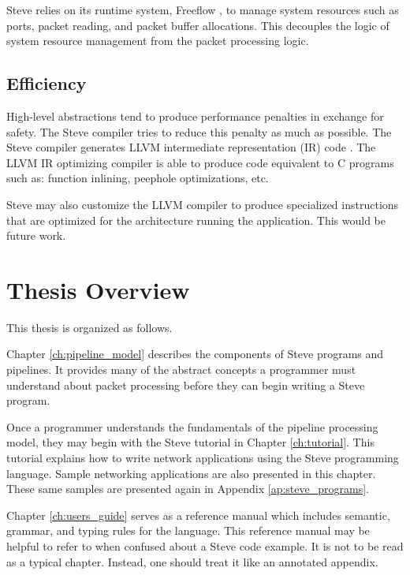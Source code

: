 Steve relies on its runtime system, Freeflow \cite{freeflow_software}, 
to manage system resources such as
ports, packet reading, and packet buffer allocations.
This decouples the logic of system resource management from the packet
processing logic.

\subsection{Efficiency}


High-level abstractions tend to produce performance penalties in exchange
for safety. The Steve compiler tries to reduce this penalty as much as possible.
The Steve compiler generates LLVM intermediate representation (IR) code
\cite{llvm_webpage}. The LLVM IR optimizing compiler is able to produce 
code equivalent to C programs such as:
function inlining, peephole optimizations, etc.

Steve may also customize the LLVM compiler to produce
specialized instructions that are optimized for the architecture running
the application. This would be future work.

\section{Thesis Overview}

This thesis is organized as follows.

Chapter \ref{ch:pipeline_model} describes the components of Steve programs
and pipelines. It provides many of the abstract concepts a programmer must
understand about packet processing before they can begin writing a Steve
program.

Once a programmer understands the fundamentals of the pipeline processing model,
they may begin with the Steve tutorial in Chapter \ref{ch:tutorial}.
This tutorial explains how to write network applications using the
Steve programming language. Sample networking applications are also presented in
this chapter. These same samples are presented again in Appendix
\ref{ap:steve_programs}. 

Chapter \ref{ch:users_guide} serves as a reference
manual which includes semantic, grammar, and typing rules for the language.
This reference manual may be helpful to refer to when confused about a
Steve code example.
It is not to be read as a typical chapter. Instead, one should 
treat it like an annotated appendix.

